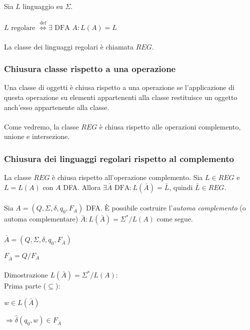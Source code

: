 \documentclass[]{article}
\begin{document}
Sia \mbox{$ L $} linguaggio su \mbox{$ \Sigma $}.
\\
\\
\mbox{$ L \text{ regolare }
\overset{\text{def}}{\Leftrightarrow}
\exists \text{ DFA } A \colon L(A) = L $}
\\
\\
La classe dei linguaggi regolari è chiamata \mbox{$ REG $}.



\subsubsection{Chiusura classe rispetto a una operazione}

Una classe di oggetti è chiusa rispetto a una operazione se l'applicazione di questa operazione su
elementi appartenenti alla classe restituisce un oggetto anch'esso appartenente alla classe.
\\
\\
Come vedremo, la classe \mbox{$ REG $} è chiusa rispetto alle operazioni complemento, unione
e intersezione.



\newpage
\subsubsection{Chiusura dei linguaggi regolari rispetto al complemento}

La classe \mbox{$ REG $} è chiusa rispetto all'operazione complemento. Sia \mbox{$ L \in REG $} e
\mbox{$ L = L(A) $} con \mbox{$ A $} DFA. Allora
\mbox{$ \exists \bar{A} \text{ DFA} \colon L(\bar{A}) = \bar{L} $}, quindi
\mbox{$ \bar{L} \in REG $}.
\\
\\
Sia \mbox{$ A = (Q, \Sigma, \delta, q_0, F_A) $} DFA. È possibile costruire l'\textit{automa complemento}
(o automa complementare) \mbox{$ \bar{A} \colon L(\bar{A}) = \Sigma^* / L(A) $} come segue.
\\
\\
\mbox{$ \bar{A} = (Q, \Sigma, \delta, q_0, F_{\bar{A}}) $}

\mbox{$ F_{\bar{A}} = Q / F_A $}
\\
\\
Dimostrazione \mbox{$ L(\bar{A}) = \Sigma^* / L(A) $}:
\\
Prima parte (\mbox{$ \subseteq $}):

\mbox{$ w \in L(\bar{A}) $}

\mbox{$ \Rightarrow \hat\delta(q_0, w) \in F_{\bar{A}} $}
\end{document}
